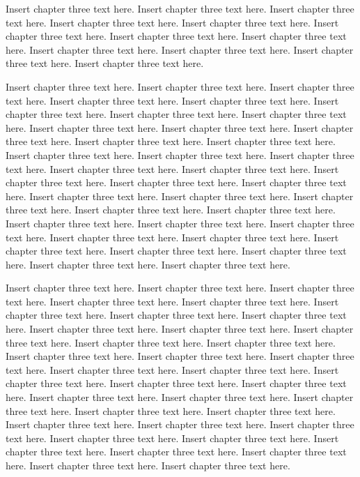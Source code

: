 Insert chapter three text here. Insert chapter three text here. Insert chapter three text here. Insert chapter three text here. Insert chapter three text here. Insert chapter three text here. Insert chapter three text here. Insert chapter three text here. Insert chapter three text here. Insert chapter three text here. Insert chapter three text here. Insert chapter three text here.

Insert chapter three text here. Insert chapter three text here. Insert chapter three text here. Insert chapter three text here. Insert chapter three text here. Insert chapter three text here. Insert chapter three text here. Insert chapter three text here. Insert chapter three text here. Insert chapter three text here. Insert chapter three text here. Insert chapter three text here. Insert chapter three text here. Insert chapter three text here. Insert chapter three text here. Insert chapter three text here. Insert chapter three text here. Insert chapter three text here. Insert chapter three text here. Insert chapter three text here. Insert chapter three text here. Insert chapter three text here. Insert chapter three text here. Insert chapter three text here. Insert chapter three text here. Insert chapter three text here. Insert chapter three text here. Insert chapter three text here. Insert chapter three text here. Insert chapter three text here. Insert chapter three text here. Insert chapter three text here. Insert chapter three text here. Insert chapter three text here. Insert chapter three text here. Insert chapter three text here.

Insert chapter three text here. Insert chapter three text here. Insert chapter three text here. Insert chapter three text here. Insert chapter three text here. Insert chapter three text here. Insert chapter three text here. Insert chapter three text here. Insert chapter three text here. Insert chapter three text here. Insert chapter three text here. Insert chapter three text here. Insert chapter three text here. Insert chapter three text here. Insert chapter three text here. Insert chapter three text here. Insert chapter three text here. Insert chapter three text here. Insert chapter three text here. Insert chapter three text here. Insert chapter three text here. Insert chapter three text here. Insert chapter three text here. Insert chapter three text here. Insert chapter three text here. Insert chapter three text here. Insert chapter three text here. Insert chapter three text here. Insert chapter three text here. Insert chapter three text here. Insert chapter three text here. Insert chapter three text here. Insert chapter three text here. Insert chapter three text here. Insert chapter three text here. Insert chapter three text here.

